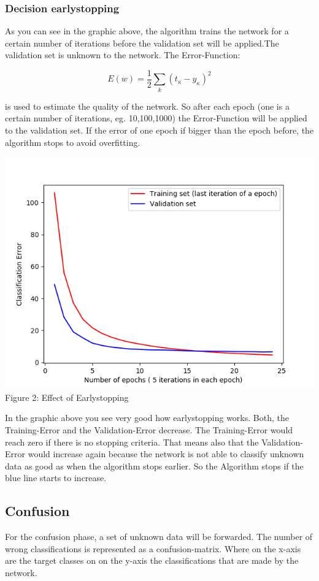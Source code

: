 \documentclass[10pt,a4paper]{article}
\begin{document}
	\subsubsection{Decision earlystopping}		%
	 As you can see in the graphic above, the algorithm trains the network for a certain number of iterations before the validation set will be applied.The validation set is unknown to the network. The Error-Function: \\
	 	\begin{center}
	 	\begin{equation}
	 	E(w) = \frac{1}{2} \sum_{k} (t_{\kappa} - y_{\kappa})^{2}
	 	\end{equation} 
	 \end{center}
 	is used to estimate the quality of the network. So after each epoch (one is a certain number of iterations, eg. 10,100,1000) the Error-Function will be applied to the validation set. If the error of one epoch if bigger than the epoch before, the algorithm stops to avoid overfitting.
 	\begin{center}
 		\includegraphics[width=0.8\linewidth]{pictures/earlystopping}
 		\\Figure 2: Effect of Earlystopping
 	\end{center}
 	In the graphic above you see very good how earlystopping works. Both, the Training-Error and the Validation-Error decrease. The Training-Error would reach zero if there is no stopping criteria. That means also that the Validation-Error would increase again because the network is not able to classify unknown data as good as when the algorithm stops earlier. So the Algorithm stops if the blue line starts to increase. 
 	\subsection{Confusion}					%
 	For the confusion phase, a set of unknown data will be forwarded. The number of wrong classifications is represented as a confusion-matrix. Where on the x-axis are the target classes on on the y-axis the classifications that are made by the network.
 	
\end{document}
